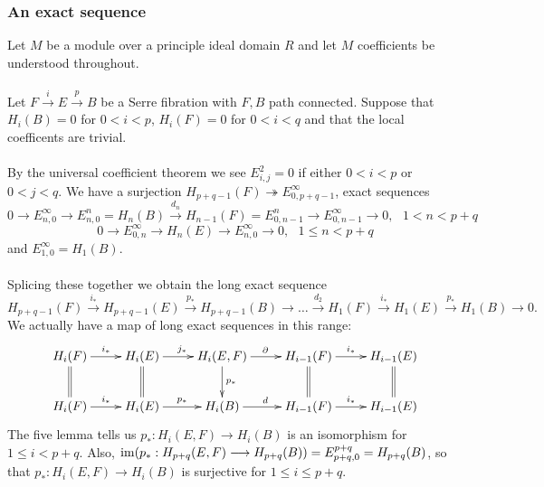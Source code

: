 \documentclass[11pt]{article}
\begin{document}
\begin{Jandr SSS notes}
	\subsubsection{An exact sequence}
Let $M$ be a module over a principle ideal domain $R$ and let $M$ coefficients be understood throughout.\\
\\
Let $F\overset{i}{\to} E\overset{p}{\to} B$ be a Serre fibration with $F,B$ path connected. Suppose that $H_i(B)=0$ for $0<i<p$, $H_i(F)=0$ for $0<i<q$ and that the local coefficents are trivial.\\
\\
By the universal coefficient theorem we see $E^2_{i,j}=0$ if either $0<i<p$ or $0<j<q$. We have a surjection $H_{p+q-1}(F)\twoheadrightarrow E^{\infty}_{0,p+q-1}$, exact sequences
\[0\to E^{\infty}_{n,0}\to E^n_{n,0}=H_n(B)\overset{d_n}{\to}H_{n-1}(F)=E^n_{0,n-1}\to E^{\infty}_{0,n-1}\to 0, \hspace{8pt} 1<n<p+q\]
\[0\to E^{\infty}_{0,n}\to H_n(E)\to E^{\infty}_{n,0}\to 0, \hspace{8pt} 1\leq n<p+q\]
and $E^{\infty}_{1,0}=H_1(B)$.\\
\\
Splicing these together we obtain the long exact sequence
\[H_{p+q-1}(F)\overset{i_*}{\to}H_{p+q-1}(E)\overset{p_*}{\to}
H_{p+q-1}(B)\to\ldots\overset{d_2}{\to}H_1(F)\overset{i_*}{\to} H_1(E)\overset{p_*}{\to}H_1(B)\to 0.\]
We actually have a map of long exact sequences in this range:
\[\xymatrix{H_i(F)\ar[r]^{i_*}\ar@{=}[d] & H_i(E)\ar[r]^{j_*}\ar@{=}[d] &
H_i(E,F)\ar[r]^{\partial}\ar[d]^{p_*} & H_{i-1}(F)\ar[r]^{i_*}\ar@{=}[d] & H_{i-1}(E)\ar@{=}[d]\\
H_i(F)\ar[r]^{i_*} & H_i(E)\ar[r]^{p_*} & H_i(B)\ar[r]^d & H_{i-1}(F)\ar[r]^{i_*} & H_{i-1}(E)}
\]
The five lemma tells us $p_*:H_i(E,F)\to H_i(B)$ is an isomorphism for $1\leq i <p+q$. Also, $\operatorname{im}(p_*:H_{p+q}(E,F)\longrightarrow H_{p+q}(B))=E^{p+q}_{p+q,0}=H_{p+q}(B)$, so that $p_*:H_i(E,F)\to H_i(B)$ is surjective for $1\leq i\leq p+q$.



\end{Jandr SSS notes}
\end{document}
